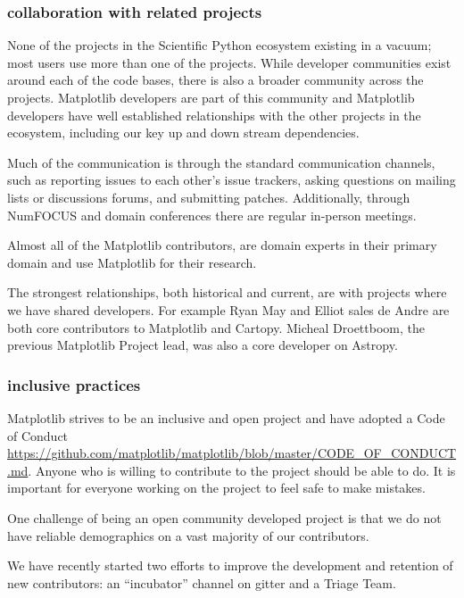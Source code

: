 \documentclass[12pt]{article}
\numberwithin{page}{section}
\begin{document}
\subsubsection{collaboration with related projects}

None of the projects in the Scientific Python ecosystem existing in a
vacuum; most users use more than one of the projects.  While developer
communities exist around each of the code bases, there is also a
broader community across the projects.  Matplotlib developers are part
of this community and Matplotlib developers have well established
relationships with the other projects in the ecosystem, including our
key up and down stream dependencies.

Much of the communication is through the standard communication
channels, such as reporting issues to each other's issue trackers,
asking questions on mailing lists or discussions forums, and
submitting patches.  Additionally, through NumFOCUS and domain
conferences there are regular in-person meetings.

Almost all of the Matplotlib contributors, are domain experts in their
primary domain and use Matplotlib for their research.

The strongest relationships, both historical and current, are with
projects where we have shared developers.  For example Ryan May and
Elliot sales de Andre are both core contributors to Matplotlib and
Cartopy.  Micheal Droettboom, the previous Matplotlib Project lead,
was also a core developer on Astropy.



\subsubsection{inclusive practices}

Matplotlib strives to be an inclusive and open project and have
adopted a Code of Conduct
\url{https://github.com/matplotlib/matplotlib/blob/master/CODE_OF_CONDUCT.md}. Anyone
who is willing to contribute to the project should be able to do.  It
is important for everyone working on the project to feel safe to make
mistakes.

One challenge of being an open community developed project is that we do not
have reliable demographics on a vast majority of our contributors.

We have recently started two efforts to improve the development and
retention of new contributors: an ``incubator'' channel on gitter and
a Triage Team.
\end{document}
